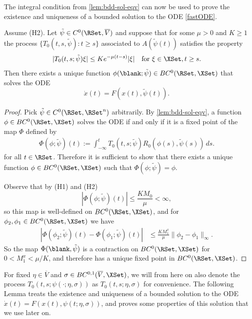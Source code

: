 \documentclass[a4paper]{siamart190516}
\begin{document}
 The integral condition from \cref{lem:bdd-sol-eqv} can now be used to prove the
 existence and uniqueness of a bounded solution to the ODE \cref{fastODE}.

\begin{lemma}\label{lem:bdd-sol-uniqueness}
Assume (H2).  Let $\tilde{\psi} \in C^0(\RSet,\overline{V})$ and suppose that for some $\mu > 0$ and  $K \geq 1$ the process $\{ T_0(t,s,\tilde{\psi}): t \geq s \}$ associated to $A(\tilde{\psi}(t))$ satisfies the property 
\[
| T_0(t,s; \tilde{\psi}) \xi | \leq K e^{-\mu(t-s)} |\xi| \quad \text{for } \xi \in \XSet, t \geq s.
\]
Then there exists a unique function $\phi(\blank; \tilde{\psi}) \in BC^0(\RSet, \XSet)$ that solves the ODE
\[
\dot{x}(t) = F(x(t),\tilde{\psi}(t)).
\]
\end{lemma} 

\begin{proof}
Pick $\tilde{\psi} \in C^0(\RSet,\RSet^n)$ arbitrarily. By \cref{lem:bdd-sol-eqv}, a
function $\phi \in BC^0(\RSet, \XSet)$ solves the ODE if and only if it is a fixed
point of the map $\Phi$ defined by
\begin{align*}
\Phi(\phi; \tilde{\psi})(t) := \int_{-\infty}^t T_0(t,s; \tilde{\psi}) R_0(\phi(s), \tilde{\psi}(s)) \, ds.
\end{align*}
for all $t \in \RSet$. Therefore it is sufficient to show that there exists a unique function $\phi \in BC^0(\RSet, \XSet)$ such that $\Phi(\phi; \tilde{\psi}) = \phi$.  

Observe that by (H1) and (H2)
\[
|\Phi(\phi; \tilde{\psi}) (t) | \leq \frac{K M_0}{\mu} < \infty,
\]
so this map is well-defined on $BC^0(\RSet, \XSet)$, and for $\phi_2, \phi_1 \in BC^0(\RSet, \XSet)$ we have
\begin{align*}
| \Phi(\phi_2; \tilde{\psi}) (t) -  \Phi(\phi_1; \tilde{\psi}) (t)|  &\leq \frac{K M_1^x}{\mu} \|\phi_2 - \phi_1\|_{\infty}.
\end{align*}
So the map $\Phi(\blank, \tilde{\psi})$ is a contraction on $BC^0(\RSet, \XSet)$ for $0 < M_1^x < \mu / K$, and therefore has a unique fixed point in $BC^0(\RSet, \XSet)$. 
\end{proof}

For fixed $\eta \in \overline{V}$ and $\sigma \in BC^{0,1}(\overline{V}, \XSet)$, we will from here on also denote the process $T_0(t,s; \psi(\cdot; \eta, \sigma))$ as $T_0(t,s; \eta, \sigma)$ for convenience. The following Lemma treats the existence and uniqueness of a bounded solution to the ODE $\dot{x}(t) = F(x(t),\psi(t;\eta,\sigma))$, and proves some properties of this solution that we use later on.
 
\end{document}
